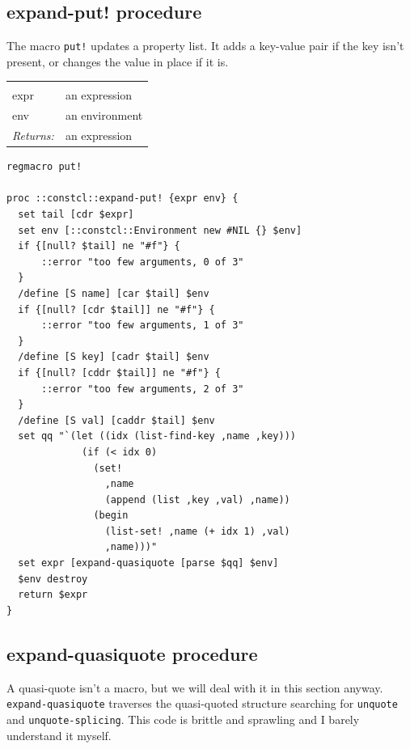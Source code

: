 \documentclass[twoside,9pt]{report}
\begin{document}
\subsection{expand-put! procedure}
\label{expand-put"!-procedure}


The macro \texttt{put!} updates a property list. It adds a key-value pair if the key isn't present, or changes the value in place if it is.

\noindent\begin{tabular}{ |p{1.5cm} p{8cm}| }
\hline
\rowcolor[HTML]{CCCCCC} \multicolumn{2}{|l|}{\bf expand-put! (internal)} \\
expr & an expression \\
env & an environment \\
\textit{Returns:} & an expression \\
\hline
\end{tabular}
\begin{lstlisting}
regmacro put!
 
proc ::constcl::expand-put! {expr env} {
  set tail [cdr $expr]
  set env [::constcl::Environment new #NIL {} $env]
  if {[null? $tail] ne "#f"} {
      ::error "too few arguments, 0 of 3"
  }
  /define [S name] [car $tail] $env
  if {[null? [cdr $tail]] ne "#f"} {
      ::error "too few arguments, 1 of 3"
  }
  /define [S key] [cadr $tail] $env
  if {[null? [cddr $tail]] ne "#f"} {
      ::error "too few arguments, 2 of 3"
  }
  /define [S val] [caddr $tail] $env
  set qq "`(let ((idx (list-find-key ,name ,key)))
             (if (< idx 0)
               (set! 
                 ,name
                 (append (list ,key ,val) ,name))
               (begin
                 (list-set! ,name (+ idx 1) ,val)
                 ,name)))"
  set expr [expand-quasiquote [parse $qq] $env]
  $env destroy
  return $expr
}
\end{lstlisting}
\subsection{expand-quasiquote procedure}
\label{expand-quasiquote-procedure}


A quasi-quote isn't a macro, but we will deal with it in this section anyway. \texttt{expand-quasiquote} traverses the quasi-quoted structure searching for \texttt{unquote} and \texttt{unquote-splicing}. This code is brittle and sprawling and I barely understand it myself.
\end{document}
